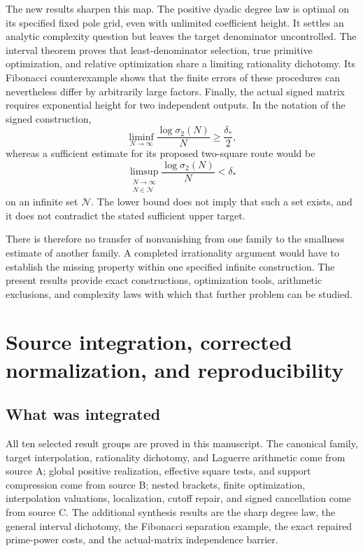 \documentclass[11pt,a4paper]{article}
\theoremstyle{definition}
\theoremstyle{remark}
\begin{document}
The new results sharpen this map. The positive dyadic degree law is
optimal on its specified fixed pole grid, even with unlimited coefficient
height. It settles an analytic complexity question but leaves the
target denominator uncontrolled. The interval theorem proves that
least-denominator selection, true primitive optimization, and relative
optimization share a limiting rationality dichotomy. Its Fibonacci
counterexample shows that the finite errors of these procedures can
nevertheless differ by arbitrarily large factors. Finally, the actual
signed matrix requires exponential height for two independent outputs.
In the notation of the signed construction,
\[
 \liminf_{N\to\infty}\frac{\log\sigma_2(N)}N
 \ge\frac{\delta_*}{2},
\]
whereas a sufficient estimate for its proposed two-square route would be
\[
 \limsup_{\substack{N\to\infty\\N\in\mathcal N}}
       \frac{\log\sigma_2(N)}N<\delta_*
\]
on an infinite set \(\mathcal N\). The lower bound does not imply that
such a set exists, and it does not contradict the stated sufficient
upper target.

There is therefore no transfer of nonvanishing from one family to the
smallness estimate of another family. A completed irrationality argument
would have to establish the missing property within one specified
infinite construction. The present results provide exact constructions,
optimization tools, arithmetic exclusions, and complexity laws with
which that further problem can be studied.

\appendix
\section{Source integration, corrected normalization, and reproducibility}
\label{unified-reproducibility}

\subsection{What was integrated}

All ten selected result groups are proved in this manuscript. The
canonical family, target interpolation, rationality dichotomy, and
Laguerre arithmetic come from source A; global positive realization,
effective square tests, and support compression come from source B;
nested brackets, finite optimization, interpolation valuations,
localization, cutoff repair, and signed cancellation come from source C.
The additional synthesis results are the sharp degree law, the general
interval dichotomy, the Fibonacci separation example, the exact repaired
prime-power costs, and the actual-matrix independence barrier.
\end{document}
